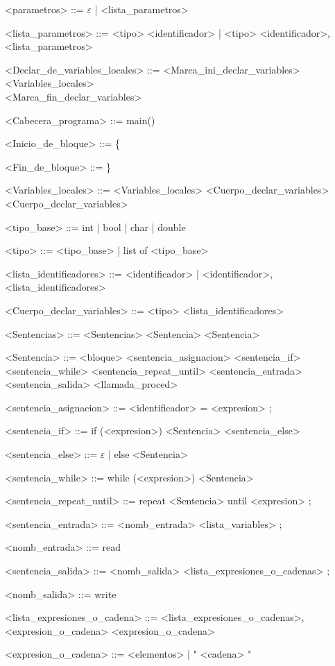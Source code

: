 \documentclass{scrartcl}
\begin{document}
\begin{grammar}
<parametros> ::= $\varepsilon$ | <lista_parametros>

<lista_parametros> ::= <tipo> <identificador> | <tipo> <identificador>, <lista_parametros>

<Declar_de_variables_locales> ::= <Marca_ini_declar_variables> \\
<Variables_locales> \\
<Marca_fin_declar_variables>

<Cabecera_programa> ::= main()

<Inicio_de_bloque> ::= \{

<Fin_de_bloque> ::= \}

<Variables_locales> ::= <Variables_locales> <Cuerpo_declar_variables>
\alt <Cuerpo_declar_variables>

<tipo_base> ::= int | bool | char | double

<tipo> ::= <tipo_base> | list of <tipo_base>

<lista_identificadores> ::= <identificador> | <identificador>, <lista_identificadores>

<Cuerpo_declar_variables> ::= <tipo> <lista_identificadores>

<Sentencias> ::= <Sentencias> <Sentencia>
\alt <Sentencia>

<Sentencia> ::= <bloque>
\alt <sentencia_asignacion>
\alt <sentencia_if>
\alt <sentencia_while>
\alt <sentencia_repeat_until>
\alt <sentencia_entrada>
\alt <sentencia_salida>
\alt <llamada_proced>

<sentencia_asignacion> ::=  <identificador> = <expresion> ;

<sentencia_if> ::= if (<expresion>) <Sentencia> <sentencia_else>

<sentencia_else> ::= $\varepsilon$ | else <Sentencia>

<sentencia_while> ::= while (<expresion>) <Sentencia>

<sentencia_repeat_until> ::= repeat <Sentencia> until <expresion> ;

<sentencia_entrada> ::= <nomb_entrada> <lista_variables> ;

<nomb_entrada> ::= read

<sentencia_salida> ::= <nomb_salida> <lista_expresiones_o_cadenas> ;

<nomb_salida> ::= write

<lista_expresiones_o_cadena> ::= <lista_expresiones_o_cadenas>, <expresion_o_cadena>
\alt <expresion_o_cadena>

<expresion_o_cadena> ::= <elementos> | " <cadena> "


\end{grammar}
\end{document}
